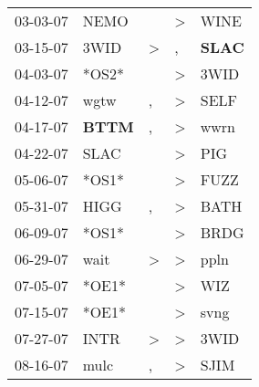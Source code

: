 \begin{supertabular}{p{0.07\textwidth}p{0.06\textwidth}p{0.02\textwidth}p{0.02\textwidth}p{0.06\textwidth}}
          03-03-07\textsuperscript{} &           NEMO\textsuperscript{} &                  &     \textgreater &           WINE\textsuperscript{} \\
          03-15-07\textsuperscript{} &           3WID\textsuperscript{} &     \textgreater &                , &  \textbf{SLAC\textsuperscript{}} \\
          04-03-07\textsuperscript{} &                            *OS2* &                  &     \textgreater &           3WID\textsuperscript{} \\
          04-12-07\textsuperscript{} &           wgtw\textsuperscript{} &                , &     \textgreater &           SELF\textsuperscript{} \\
          04-17-07\textsuperscript{} &  \textbf{BTTM\textsuperscript{}} &                , &     \textgreater &           wwrn\textsuperscript{} \\
          04-22-07\textsuperscript{} &           SLAC\textsuperscript{} &                  &     \textgreater &            PIG\textsuperscript{} \\
          05-06-07\textsuperscript{} &                            *OS1* &                  &     \textgreater &           FUZZ\textsuperscript{} \\
          05-31-07\textsuperscript{} &           HIGG\textsuperscript{} &                , &     \textgreater &           BATH\textsuperscript{} \\
          06-09-07\textsuperscript{} &                            *OS1* &                  &     \textgreater &           BRDG\textsuperscript{} \\
          06-29-07\textsuperscript{} &           wait\textsuperscript{} &     \textgreater &     \textgreater &           ppln\textsuperscript{} \\
          07-05-07\textsuperscript{} &                            *OE1* &                  &     \textgreater &            WIZ\textsuperscript{} \\
          07-15-07\textsuperscript{} &                            *OE1* &                  &     \textgreater &           svng\textsuperscript{} \\
          07-27-07\textsuperscript{} &           INTR\textsuperscript{} &     \textgreater &     \textgreater &           3WID\textsuperscript{} \\
          08-16-07\textsuperscript{} &           mulc\textsuperscript{} &                , &     \textgreater &           SJIM\textsuperscript{} \\

\end{supertabular}
